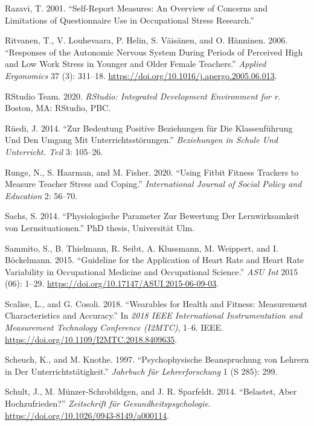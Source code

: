 \documentclass[preprint,
3p]{elsarticle} %
\newlength{\cslhangindent}
\newenvironment{CSLReferences}[2] %
 {\begin{list}{}{%
  \setlength{\itemindent}{0pt}
  \setlength{\leftmargin}{0pt}
  \setlength{\parsep}{0pt}
  \ifodd #1
   \setlength{\leftmargin}{\cslhangindent}
   \setlength{\itemindent}{-1\cslhangindent}
  \fi
  \setlength{\itemsep}{#2\baselineskip}}}
 {\end{list}}
\begin{document}
\begin{CSLReferences}{1}{0}
Razavi, T. 2001. {``Self-Report Measures: An Overview of Concerns and
Limitations of Questionnaire Use in Occupational Stress Research.''}

Ritvanen, T., V. Louhevaara, P. Helin, S. Väisänen, and O. Hänninen.
2006. {``Responses of the Autonomic Nervous System During Periods of
Perceived High and Low Work Stress in Younger and Older Female
Teachers.''} \emph{Applied Ergonomics} 37 (3): 311--18.
\url{https://doi.org/10.1016/j.apergo.2005.06.013}.

RStudio Team. 2020. \emph{RStudio: Integrated Development Environment
for r}. Boston, MA: RStudio, PBC.

Rüedi, J. 2014. {``Zur Bedeutung Positive Beziehungen f{ü}r Die
Klassenf{ü}hrung Und Den Umgang Mit Unterrichtsst{ö}rungen.''}
\emph{Beziehungen in Schule Und Unterricht. Teil} 3: 105--26.

Runge, N., S. Haarman, and M. Fisher. 2020. {``Using Fitbit Fitness
Trackers to Measure Teacher Stress and Coping.''} \emph{International
Journal of Social Policy and Education} 2: 56--70.

Sachs, S. 2014. {``Physiologische Parameter Zur Bewertung Der
Lernwirksamkeit von Lernsituationen.''} PhD thesis, Universit{ä}t Ulm.

Sammito, S., B. Thielmann, R. Seibt, A. Klussmann, M. Weippert, and I.
Böckelmann. 2015. {``Guideline for the Application of Heart Rate and
Heart Rate Variability in Occupational Medicine and Occupational
Science.''} \emph{ASU Int} 2015 (06): 1--29.
\url{https://doi.org/10.17147/ASUI.2015-06-09-03}.

Scalise, L., and G. Cosoli. 2018. {``Wearables for Health and Fitness:
Measurement Characteristics and Accuracy.''} In \emph{2018 IEEE
International Instrumentation and Measurement Technology Conference
(I2MTC)}, 1--6. IEEE. \url{https://doi.org/10.1109/I2MTC.2018.8409635}.

Scheuch, K., and M. Knothe. 1997. {``Psychophysische Beanspruchung von
Lehrern in Der Unterrichtst{ä}tigkeit.''} \emph{Jahrbuch f{ü}r
Lehrerforschung} 1 (S 285): 299.

Schult, J., M. Münzer-Schrobildgen, and J. R. Sparfeldt. 2014.
{``Belastet, Aber Hochzufrieden?''} \emph{Zeitschrift f{ü}r
Gesundheitspsychologie}.
\url{https://doi.org/10.1026/0943-8149/a000114}.


\end{CSLReferences}
\end{document}
